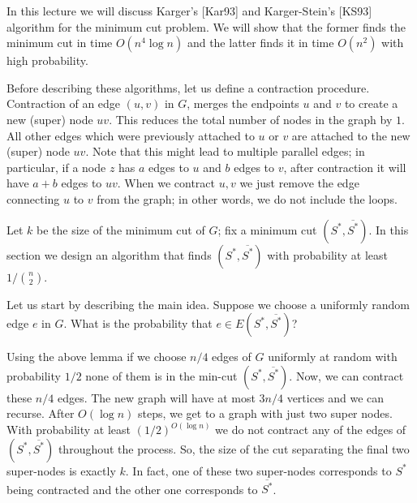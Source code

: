 In this lecture we will discuss Karger's [Kar93] and Karger-Stein's [KS93] algorithm for the minimum cut problem. We will show that the former finds the minimum cut in time $O(n^4\log n)$ and the latter finds it in time $O(n^2)$ with high probability.

Before describing these algorithms, let us define a contraction procedure. Contraction of an edge $(u,v)$ in $G$, merges the endpoints $u$ and $v$ to create a new (super) node $uv$. This reduces the total number of nodes in the graph by $1$. All other edges which were previously attached to $u$ or $v$ are attached to the new (super) node $uv$. Note that this might lead to multiple parallel edges; in particular, if a node $z$ has $a$ edges to $u$ and $b$ edges to $v$, after contraction it will have $a+b$ edges to $uv$. When we contract $u,v$ we just remove the edge connecting $u$ to $v$ from the graph; in other words, we do not include the loops.

Let $k$ be the size of the minimum cut of $G$; fix a minimum cut $(S^*,\overline{S^*})$. In this section we design an algorithm that finds $(S^*,\overline{S^*})$ with probability at least $1/\binom n2$.

Let us start by describing the main idea. Suppose we choose a uniformly random edge $e$ in $G$. What is the probability that $e\in E(S^*,\overline{S^*})$?

\label{clm:KargEdgeProb}


Using the above lemma if we choose $n/4$ edges of $G$ uniformly at random with probability $1/2$ none of them is in the min-cut $(S^*,\overline{S^*})$. Now, we can contract these $n/4$ edges. The new graph will have at most $3n/4$ vertices and we can recurse. After $O(\log n)$ steps, we get to a graph with just two super nodes. With probability at least $(1/2)^{O(\log n)}$ we do not contract any of the edges of $(S^*,\overline{S^*})$ throughout the process. So, the size of the cut separating the final two super-nodes is exactly $k$. In fact, one of these two super-nodes corresponds to $S^*$ being contracted and the other one corresponds to $\overline{S^*}$.

